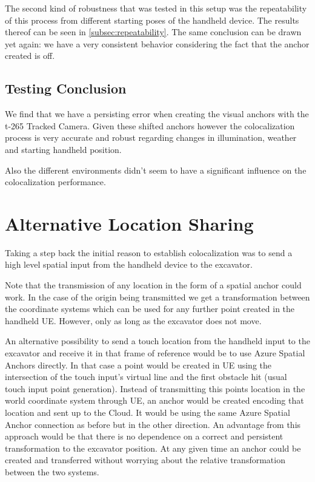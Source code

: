 The second kind of robustness that was tested in this setup was the repeatability of this process from different starting poses of the handheld device. The results thereof can be seen in \cref{subsec:repeatability}. The same conclusion can be drawn yet again: we have a very consistent behavior considering the fact that the anchor created is off.

\subsection{Testing Conclusion}\label{subsec:testing_conclusion}

We find that we have a persisting error when creating the visual anchors with the t-265 Tracked Camera. Given these shifted anchors however the colocalization process is very accurate and robust regarding changes in illumination, weather and starting handheld position.

Also the different environments didn't seem to have a significant influence on the colocalization performance.

\section{Alternative Location Sharing}\label{sec:alternative_location_transfer}

Taking a step back the initial reason to establish colocalization was to send a high level spatial input from the handheld device to the excavator.

Note that the transmission of any location in the form of a spatial anchor could work. In the case of the origin being transmitted we get a transformation between the coordinate systems which can be used for any further point created in the handheld UE. However, only as long as the excavator does not move. 

An alternative possibility to send a touch location from the handheld input to the excavator and receive it in that frame of reference would be to use Azure Spatial Anchors directly. In that case a point would be created in UE using the intersection of the touch input's virtual line and the first obstacle hit (usual touch input point generation). Instead of transmitting this points location in the world coordinate system through UE, an anchor would be created encoding that location and sent up to the Cloud. It would be using the same Azure Spatial Anchor connection as before but in the other direction. An advantage from this approach would be that there is no dependence on a correct and persistent transformation to the excavator position. At any given time an anchor could be created and transferred without worrying about the relative transformation between the two systems.
